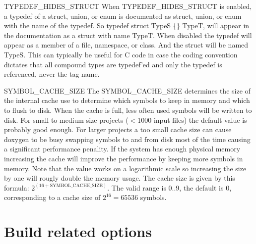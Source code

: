 \begin{DoxyDescription}
\label{config_cfg_typedef_hides_struct}
\hypertarget{config_cfg_typedef_hides_struct}{}
 
\item[{\ttfamily TYPEDEF\_\-HIDES\_\-STRUCT} ] When {\ttfamily TYPEDEF\_\-HIDES\_\-STRUCT} is enabled, a typedef of a struct, union, or enum is documented as struct, union, or enum with the name of the typedef. So {\ttfamily typedef struct TypeS \{\} TypeT}, will appear in the documentation as a struct with name {\ttfamily TypeT}. When disabled the typedef will appear as a member of a file, namespace, or class. And the struct will be named {\ttfamily TypeS}. This can typically be useful for C code in case the coding convention dictates that all compound types are typedef'ed and only the typedef is referenced, never the tag name.

\label{config_cfg_symbol_cache_size}
\hypertarget{config_cfg_symbol_cache_size}{}
 
\item[{\ttfamily SYMBOL\_\-CACHE\_\-SIZE} ] The {\ttfamily SYMBOL\_\-CACHE\_\-SIZE} determines the size of the internal cache use to determine which symbols to keep in memory and which to flush to disk. When the cache is full, less often used symbols will be written to disk. For small to medium size projects ($<$1000 input files) the default value is probably good enough. For larger projects a too small cache size can cause doxygen to be busy swapping symbols to and from disk most of the time causing a significant performance penality. If the system has enough physical memory increasing the cache will improve the performance by keeping more symbols in memory. Note that the value works on a logarithmic scale so increasing the size by one will rougly double the memory usage. The cache size is given by this formula: $2^{(16+\mbox{SYMBOL\_CACHE\_SIZE})}$. The valid range is 0..9, the default is 0, corresponding to a cache size of $2^{16} = 65536$ symbols.


\end{DoxyDescription}\hypertarget{config_config_build}{}\section{Build related options}\label{config_config_build}
\label{config_cfg_extract_all}
\hypertarget{config_cfg_extract_all}{}
 

